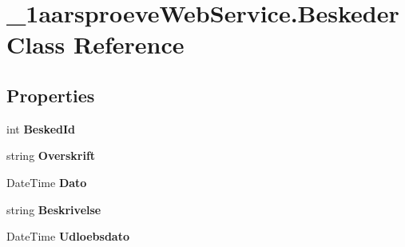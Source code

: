 \hypertarget{class__1aarsproeve_web_service_1_1_beskeder}{}\section{\+\_\+1aarsproeve\+Web\+Service.\+Beskeder Class Reference}
\label{class__1aarsproeve_web_service_1_1_beskeder}
\subsection*{Properties}
\begin{DoxyCompactItemize}
\item 
\hypertarget{class__1aarsproeve_web_service_1_1_beskeder_ac09e7a6d3196777938c99fcdc259fdb4}{}int {\bfseries Besked\+Id}\label{class__1aarsproeve_web_service_1_1_beskeder_ac09e7a6d3196777938c99fcdc259fdb4}

\item 
\hypertarget{class__1aarsproeve_web_service_1_1_beskeder_a864f1489fab328277d4a03a3416ad3f9}{}string {\bfseries Overskrift}\label{class__1aarsproeve_web_service_1_1_beskeder_a864f1489fab328277d4a03a3416ad3f9}

\item 
\hypertarget{class__1aarsproeve_web_service_1_1_beskeder_abb534e75d449df7de7da2af259a7d52b}{}Date\+Time {\bfseries Dato}\label{class__1aarsproeve_web_service_1_1_beskeder_abb534e75d449df7de7da2af259a7d52b}

\item 
\hypertarget{class__1aarsproeve_web_service_1_1_beskeder_a7ff25701d9b4ca4e372cd0c9620dd7bc}{}string {\bfseries Beskrivelse}\label{class__1aarsproeve_web_service_1_1_beskeder_a7ff25701d9b4ca4e372cd0c9620dd7bc}

\item 
\hypertarget{class__1aarsproeve_web_service_1_1_beskeder_a5fa573e7bbf0fd8acd75c52a6f29d796}{}Date\+Time {\bfseries Udloebsdato}\label{class__1aarsproeve_web_service_1_1_beskeder_a5fa573e7bbf0fd8acd75c52a6f29d796}


\end{DoxyCompactItemize}
